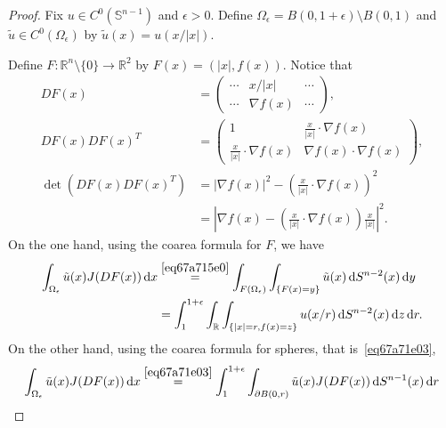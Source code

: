 \documentclass[a4paper,9pt]{amsart}
\newcommand{\bb}[1]{\mathbb{#1}}
\newcommand{\R}{\mathbb{R}}	%
\newcommand{\dd}{\mathrm{d}}	%
\newcommand{\did}{\,\mathrm{d}}	%
\newcommand{\de}{\partial}		%
\newcommand{\grad}{\nabla}
\theoremstyle{plain}
\theoremstyle{definition}
\theoremstyle{remark}
\begin{document}
\begin{proof}
	Fix $u\in C^0(\bb S^{n-1})$ and $\epsilon>0$.
	Define $\Omega_\epsilon = B(0,1+\epsilon)\setminus B(0,1)$ and 
	$\tilde u\in C^0(\Omega_\epsilon)$ by $\tilde u(x) = u(x/|x|)$.
	
	Define $F:\R^n\setminus\{0\}\to \R^2$ by $F(x) = (|x|,f(x))$.
	Notice that
	\begin{align*}
		DF(x) &= \begin{pmatrix} \cdots & x/|x| & \cdots \\ \cdots & \grad f(x) & \cdots \end{pmatrix} , \\
		DF(x)DF(x)^T &= \begin{pmatrix}1&\frac{x}{|x|}\cdot\grad f(x) \\ \frac{x}{|x|}\cdot\grad f(x) & \grad f(x) \cdot \grad f(x)\end{pmatrix} , \\
		\det( DF(x)DF(x)^T ) &= |\grad f(x)|^2 - \left(\frac{x}{|x|}\cdot\grad f(x)\right)^2 \\
			&= \left| \grad f(x) - \left(\frac{x}{|x|}\cdot\grad f(x) \right) \frac{x}{|x|} \right|^2 .
	\end{align*}
	On the one hand, using the coarea formula for $F$, we have
	\begin{align*}
	\int_{\Omega_\epsilon} \tilde u(x) J(DF(x)) \did x 
	&\overset{\eqref{eq67a715e0}}= \int_{F(\Omega_\epsilon)} \int_{\{F(x)=y\}} \tilde u(x) \did S^{n-2}(x) \did y \\
	&= \int_1^{1+\epsilon} \int_{\R} \int_{\{|x| = r, f(x) = z\}} u(x/r) \did S^{n-2}(x) \did z \did r .
	\end{align*}
	On the other hand, using the coarea formula for spheres, that is~\eqref{eq67a71e03},
	\begin{align*}
	\int_{\Omega_\epsilon} \tilde u(x) J(DF(x)) \did x 
	&\overset{\eqref{eq67a71e03}}= \int_1^{1+\epsilon} \int_{\de B(0,r)} \tilde u(x) J(DF(x)) \did S^{n-1}(x) \did r \\

\end{align*}
\end{proof}
\end{document}

